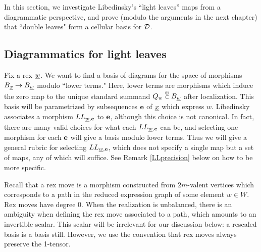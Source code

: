 In this section, we investigate Libedinsky's ``light leaves'' maps \cite{Lib} from a diagrammatic perspective, and prove (modulo the arguments in the next chapter) that ``double leaves"
form a cellular basis for ${\mathcal{D}}$.



\subsection{Diagrammatics for light leaves}
\label{subsec-LibedDiag}

Fix a rex ${\underline{w}}$. We want to find a basis of diagrams for the space of morphisms $B_{\underline{x}} \rightarrow B_{\underline{w}}$ modulo ``lower terms." Here, lower terms are morphisms which induce the
zero map to the unique standard summand $Q_w \stackrel{\scriptstyle{\oplus}}{\scriptstyle{\subset}} B_{\underline{w}}$ after localization. This basis will be parametrized by subsequences ${\mathbf e}$ of $\underline{x}$ which express $w$. Libedinsky
associates a morphism $LL_{{\underline{w}},{\mathbf e}}$ to ${\mathbf e}$, although this choice is not canonical. In fact, there are many valid choices for what each $LL_{{\underline{w}},{\mathbf e}}$ can be, and selecting
one morphism for each ${\mathbf e}$ will give a basis modulo lower terms. Thus we will give a general rubric for selecting $LL_{{\underline{w}},{\mathbf e}}$, which does not specify a single map but a set of
maps, any of which will suffice. See Remark \ref{LLprecision} below on how to be more specific.

Recall that a rex move is a morphism constructed from $2m$-valent vertices which corresponds to a path in the reduced expression graph of some element $w \in W$. Rex moves have degree $0$.
When the realization is unbalanced, there is an ambiguity when defining the rex move associated to a path, which amounts to an invertible scalar. This scalar will be irrelevant for our
discussion below: a rescaled basis is a basis still. However, we use the convention that rex moves always preserve the 1-tensor.

